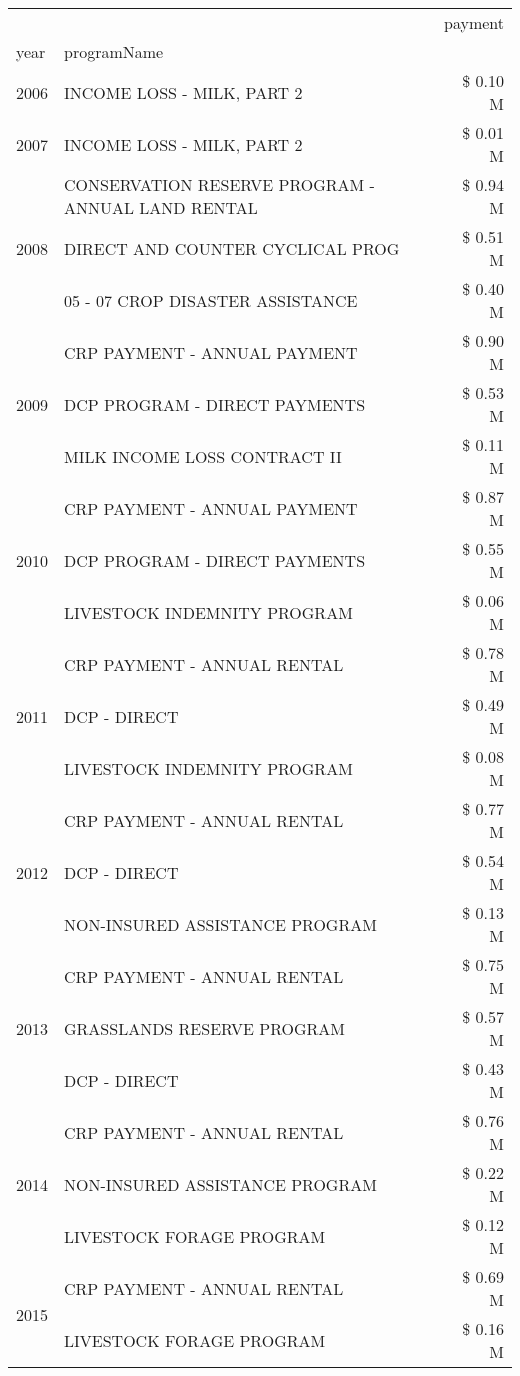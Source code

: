 \begin{tabular}{llr}
\toprule
 &  & payment \\
year & programName &  \\
\midrule
2006 & INCOME LOSS - MILK, PART 2 & \$ 0.10 M \\
\cline{1-3}
2007 & INCOME LOSS - MILK, PART 2 & \$ 0.01 M \\
\cline{1-3}
\multirow[t]{3}{*}{2008} & CONSERVATION RESERVE PROGRAM - ANNUAL LAND RENTAL & \$ 0.94 M \\
 & DIRECT AND COUNTER CYCLICAL PROG & \$ 0.51 M \\
 & 05 - 07 CROP DISASTER ASSISTANCE & \$ 0.40 M \\
\cline{1-3}
\multirow[t]{3}{*}{2009} & CRP PAYMENT - ANNUAL PAYMENT & \$ 0.90 M \\
 & DCP PROGRAM - DIRECT PAYMENTS & \$ 0.53 M \\
 & MILK INCOME LOSS CONTRACT II & \$ 0.11 M \\
\cline{1-3}
\multirow[t]{3}{*}{2010} & CRP PAYMENT - ANNUAL PAYMENT & \$ 0.87 M \\
 & DCP PROGRAM - DIRECT PAYMENTS & \$ 0.55 M \\
 & LIVESTOCK INDEMNITY PROGRAM & \$ 0.06 M \\
\cline{1-3}
\multirow[t]{3}{*}{2011} & CRP PAYMENT - ANNUAL RENTAL & \$ 0.78 M \\
 & DCP - DIRECT & \$ 0.49 M \\
 & LIVESTOCK INDEMNITY PROGRAM & \$ 0.08 M \\
\cline{1-3}
\multirow[t]{3}{*}{2012} & CRP PAYMENT - ANNUAL RENTAL & \$ 0.77 M \\
 & DCP - DIRECT & \$ 0.54 M \\
 & NON-INSURED ASSISTANCE PROGRAM & \$ 0.13 M \\
\cline{1-3}
\multirow[t]{3}{*}{2013} & CRP PAYMENT - ANNUAL RENTAL & \$ 0.75 M \\
 & GRASSLANDS RESERVE PROGRAM & \$ 0.57 M \\
 & DCP - DIRECT & \$ 0.43 M \\
\cline{1-3}
\multirow[t]{3}{*}{2014} & CRP PAYMENT - ANNUAL RENTAL & \$ 0.76 M \\
 & NON-INSURED ASSISTANCE PROGRAM & \$ 0.22 M \\
 & LIVESTOCK FORAGE PROGRAM & \$ 0.12 M \\
\cline{1-3}
\multirow[t]{3}{*}{2015} & CRP PAYMENT - ANNUAL RENTAL & \$ 0.69 M \\
 & LIVESTOCK FORAGE PROGRAM & \$ 0.16 M \\

\end{tabular}

